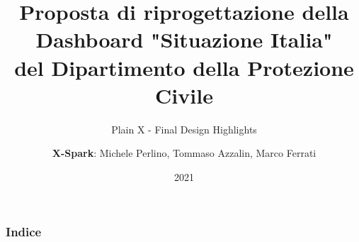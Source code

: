 





\title[Inf UFG]{Proposta di riprogettazione della\\
Dashboard "Situazione Italia"\\
del Dipartimento della Protezione Civile}
\subtitle{Plain X - Final Design Highlights}

\author{\textbf{X-Spark}: Michele Perlino, Tommaso Azzalin, Marco Ferrati}

\date{2021}
\frame[noframenumbering]{\titlepage}

\linespread{1.15}

\begin{frame}
    \frametitle{Indice}
    {
        \hypersetup{linkcolor=black}
        \tableofcontents
    }
\end{frame}



\clearpage


\clearpage



